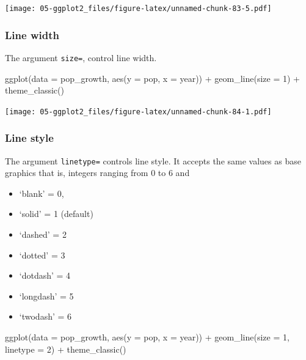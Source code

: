 \documentclass[
]{book}
\newenvironment{Shaded}{\begin{snugshade}}{\end{snugshade}}
\newcommand{\AttributeTok}[1]{\textcolor[rgb]{0.77,0.63,0.00}{#1}}
\newcommand{\DecValTok}[1]{\textcolor[rgb]{0.00,0.00,0.81}{#1}}
\newcommand{\FunctionTok}[1]{\textcolor[rgb]{0.00,0.00,0.00}{#1}}
\newcommand{\NormalTok}[1]{#1}
\newcommand{\SpecialCharTok}[1]{\textcolor[rgb]{0.00,0.00,0.00}{#1}}
\providecommand{\tightlist}{%
  \setlength{\itemsep}{0pt}\setlength{\parskip}{0pt}}
\begin{document}
\texttt{[image: 05-ggplot2\_files/figure-latex/unnamed-chunk-83-5.pdf]}

\hypertarget{line-width}{%
\subsubsection{Line width}\label{line-width}}

The argument \texttt{size=}, control line width.

\begin{Shaded}
\begin{Highlighting}[]
\FunctionTok{ggplot}\NormalTok{(}\AttributeTok{data =}\NormalTok{ pop\_growth, }\FunctionTok{aes}\NormalTok{(}\AttributeTok{y =}\NormalTok{ pop, }\AttributeTok{x =}\NormalTok{ year)) }\SpecialCharTok{+} 
  \FunctionTok{geom\_line}\NormalTok{(}\AttributeTok{size =} \DecValTok{1}\NormalTok{) }\SpecialCharTok{+}
  \FunctionTok{theme\_classic}\NormalTok{()}
\end{Highlighting}
\end{Shaded}

\texttt{[image: 05-ggplot2\_files/figure-latex/unnamed-chunk-84-1.pdf]}

\hypertarget{line-style}{%
\subsubsection{Line style}\label{line-style}}

The argument \texttt{linetype=} controls line style. It accepts the same values as base graphics that is, integers ranging from 0 to 6 and

\begin{itemize}
\tightlist
\item
  `blank' = 0,
\item
  `solid' = 1 (default)
\item
  `dashed' = 2
\item
  `dotted' = 3
\item
  `dotdash' = 4
\item
  `longdash' = 5
\item
  `twodash' = 6
\end{itemize}

\begin{Shaded}
\begin{Highlighting}[]
\FunctionTok{ggplot}\NormalTok{(}\AttributeTok{data =}\NormalTok{ pop\_growth, }\FunctionTok{aes}\NormalTok{(}\AttributeTok{y =}\NormalTok{ pop, }\AttributeTok{x =}\NormalTok{ year)) }\SpecialCharTok{+} 
  \FunctionTok{geom\_line}\NormalTok{(}\AttributeTok{size =} \DecValTok{1}\NormalTok{, }\AttributeTok{linetype =} \DecValTok{2}\NormalTok{) }\SpecialCharTok{+}
  \FunctionTok{theme\_classic}\NormalTok{()}
\end{Highlighting}
\end{Shaded}
\end{document}
